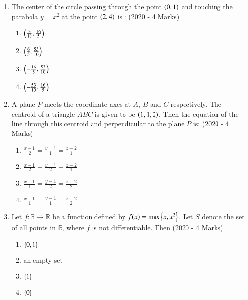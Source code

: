 \documentclass[journal]{IEEEtran}
\begin{document}
\begin{enumerate}
{        }
    \item{
	
			The center of the circle passing through the point $\left(0,1\right)$ and touching the parabola $y=x^2$ at the point $\left(2,4\right)$ is :
			\text{   }\hfill
			{(2020 - 4 Marks)}
			\begin{multicols}{4}
				\begin{enumerate}
					\item $\left(\frac{3}{10}, \frac{16}{5}\right)$
					\item $\left(\frac{6}{5}, \frac{53}{10}\right)$
					\item $\left(-\frac{16}{5}, \frac{53}{10}\right)$
					\item $\left(-\frac{53}{10}, \frac{16}{5}\right)$
				\end{enumerate}
			\end{multicols}
			
		}
    \item{
	
			A plane $P$ meets the coordinate axes at $A$, $B$ and $C$ respectively. The centroid of a triangle $ABC$ is given to be $\left(1,1,2\right)$. Then the equation of the line through this centroid and perpendicular to the plane $P$ is:
			\text{   }\hfill
			{(2020 - 4 Marks)}
			\begin{multicols}{2}
				\begin{enumerate}
					\item $\frac{x-1}{2} = \frac{y-1}{1} = \frac{z-2}{1}$
					
					\item $\frac{x-1}{2} = \frac{y-1}{2} = \frac{z-2}{1}$
					
					\item $\frac{x-1}{1} = \frac{y-1}{2} = \frac{z-2}{2}$
					
					\item $\frac{x-1}{1} = \frac{y-1}{1} = \frac{z-2}{2}$
				\end{enumerate}
			\end{multicols}
			
		}
    \item{
        
            Let $f : \mathbb{R}\rightarrow \mathbb{R}$ be a function defined by $f(x) = \max \left\{x,x^2\right\}$. Let $S$ denote the set of all points in $\mathbb{R}$, where $f$ is not differentiable. Then
             \hfill
              {(2020 - 4 Marks)}
              \begin{multicols}{2}
              	\begin{enumerate}
              		\item $\left\{0,1\right\}$
              		\item an empty set
              		\item $\left\{1\right\}$
              		\item $\left\{0\right\}$
              	\end{enumerate}
              \end{multicols}
        
        }
    \end{enumerate}
\end{document}

